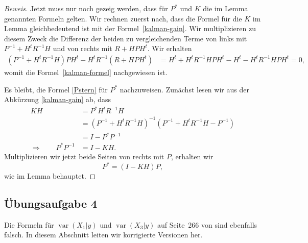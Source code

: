 \begin{proof}[Beweis]
Jetzt muss nur noch gezeig werden, dass für $P^*$ und $K$ die im Lemma
genannten Formeln gelten.
Wir rechnen zuerst nach, dass die Formel für die $K$ im Lemma gleichbedeutend
ist mit der Formel~\eqref{kalman-gain}.
Wir multiplizieren zu diesem Zweck die Differenz der beiden zu vergleichenden
Terme von links mit
$P^{-1}+H^tR^{-1}H$
und von rechts mit $R+HPH^t$.
Wir erhalten
\begin{align*}
(P^{-1}+H^tR^{-1}H)PH^t
-
H^tR^{-1}(R+HPH^t)
&=
H^t + H^tR^{-1}HPH^t
- H^t - H^tR^{-1}HPH^t
=0,
\end{align*}
womit die Formel~\eqref{kalman-formel} nachgewiesen ist.

Es bleibt, die Formel \eqref{Pstern} für $P^*$ nachzuweisen.
Zunächst lesen wir aus der Abkürzung \eqref{kalman-gain} ab, dass
\begin{align*}
KH
&=
P^*
H^tR^{-1}H
\\
&=
(P^{-1}+H^tR^{-1}H)^{-1}(P^{-1}
+H^tR^{-1}H
-P^{-1}
)
\\
&=
I- P^* P^{-1}
\\
\Rightarrow\qquad
P^*P^{-1}&=I-KH.
\end{align*}
Multiplizieren wir jetzt beide Seiten von rechts mit $P$, erhalten wir
\[
P^*
=
(I-KH)P,
\]
wie im Lemma behauptet.
\end{proof}

\subsection{Übungsaufgabe 4\label{subsection:aufgabe4}}
Die Formeln für
$\operatorname{var}(X_1|y)$
und
$\operatorname{var}(X_3|y)$
auf Seite~266 von \cite{skript:kaperengler} sind ebenfalls falsch.
In diesem Abschnitt leiten wir korrigierte Versionen her.

